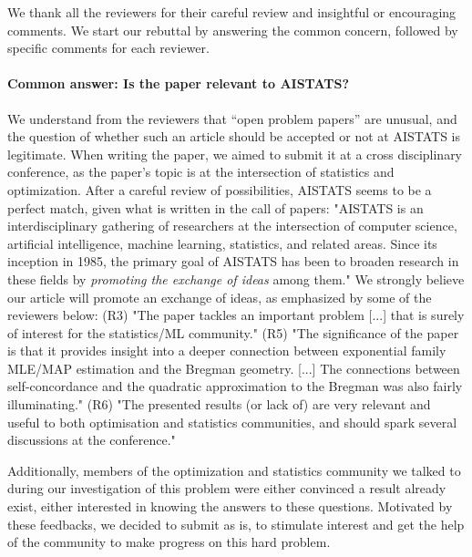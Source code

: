 
\fi


We thank all the reviewers for their careful review and insightful or encouraging comments. We start our rebuttal by answering the common concern, followed by specific comments for each reviewer.
	
\paragraph{Common answer: Is the paper relevant to AISTATS?}
We understand from the reviewers that “open problem papers”  are unusual, and the question of whether such an article should be accepted or not at AISTATS is legitimate. 
When writing the paper, we aimed to submit it at a cross disciplinary conference, as the paper’s topic is at the intersection of statistics and optimization. After a careful review of possibilities, AISTATS seems to be a perfect match, given what is written in the call of papers:
"AISTATS is an interdisciplinary gathering of researchers at the intersection of computer science, artificial intelligence, machine learning, statistics, and related areas. Since its inception in 1985, the primary goal of AISTATS has been to broaden research in these fields by \emph{promoting the exchange of ideas} among them."  
We strongly believe our article will promote an exchange of ideas, as emphasized by some of the reviewers below:
(R3) "The paper tackles an important problem [...] that is surely of interest for the statistics/ML community."
(R5)  "The significance of the paper is that it provides insight into a deeper connection between exponential family MLE/MAP estimation and the Bregman geometry. [...]  The connections between self-concordance and the quadratic approximation to the Bregman was also fairly illuminating."
(R6) "The presented results (or lack of) are very relevant and useful to both optimisation and statistics communities, and should spark several discussions at the conference."

Additionally, members of the optimization and statistics community we talked to during our investigation of this problem were 
either convinced a result already exist, 
either interested in knowing the answers to these questions.
Motivated by these feedbacks, we decided to submit as is, 
to stimulate interest and get the help of the community to make progress on this hard problem.


